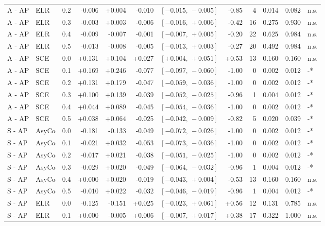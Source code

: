 \begin{landscape}
\begin{scriptsize}
\begin{longtable}{lllrrrrrrrrl}
A - AP & ELR & 0.2 & -0.006 & +0.004 & -0.010 & $[-0.015,\,-0.005]$ & -0.85 & 4 & 0.014 & 0.082 & n.s. \\
A - AP & ELR & 0.3 & -0.003 & +0.003 & -0.006 & $[-0.016,\,+0.006]$ & -0.42 & 16 & 0.275 & 0.930 & n.s. \\
A - AP & ELR & 0.4 & -0.009 & -0.007 & -0.001 & $[-0.007,\,+0.005]$ & -0.20 & 22 & 0.625 & 0.984 & n.s. \\
A - AP & ELR & 0.5 & -0.013 & -0.008 & -0.005 & $[-0.013,\,+0.003]$ & -0.27 & 20 & 0.492 & 0.984 & n.s. \\
A - AP & SCE & 0.0 & +0.131 & +0.104 & +0.027 & $[+0.004,\,+0.051]$ & +0.53 & 13 & 0.160 & 0.160 & n.s. \\
A - AP & SCE & 0.1 & +0.169 & +0.246 & -0.077 & $[-0.097,\,-0.060]$ & -1.00 & 0 & 0.002 & 0.012 & -* \\
A - AP & SCE & 0.2 & +0.131 & +0.179 & -0.047 & $[-0.059,\,-0.036]$ & -1.00 & 0 & 0.002 & 0.012 & -* \\
A - AP & SCE & 0.3 & +0.100 & +0.139 & -0.039 & $[-0.052,\,-0.025]$ & -0.96 & 1 & 0.004 & 0.012 & -* \\
A - AP & SCE & 0.4 & +0.044 & +0.089 & -0.045 & $[-0.054,\,-0.036]$ & -1.00 & 0 & 0.002 & 0.012 & -* \\
A - AP & SCE & 0.5 & +0.038 & +0.064 & -0.025 & $[-0.042,\,-0.009]$ & -0.82 & 5 & 0.020 & 0.039 & -* \\
S - AP & AsyCo & 0.0 & -0.181 & -0.133 & -0.049 & $[-0.072,\,-0.026]$ & -1.00 & 0 & 0.002 & 0.012 & -* \\
S - AP & AsyCo & 0.1 & -0.021 & +0.032 & -0.053 & $[-0.073,\,-0.036]$ & -1.00 & 0 & 0.002 & 0.012 & -* \\
S - AP & AsyCo & 0.2 & -0.017 & +0.021 & -0.038 & $[-0.051,\,-0.025]$ & -1.00 & 0 & 0.002 & 0.012 & -* \\
S - AP & AsyCo & 0.3 & -0.029 & +0.020 & -0.049 & $[-0.064,\,-0.032]$ & -0.96 & 1 & 0.004 & 0.012 & -* \\
S - AP & AsyCo & 0.4 & +0.000 & +0.020 & -0.019 & $[-0.043,\,+0.004]$ & -0.53 & 13 & 0.160 & 0.160 & n.s. \\
S - AP & AsyCo & 0.5 & -0.010 & +0.022 & -0.032 & $[-0.046,\,-0.019]$ & -0.96 & 1 & 0.004 & 0.012 & -* \\
S - AP & ELR & 0.0 & -0.125 & -0.151 & +0.025 & $[-0.023,\,+0.061]$ & +0.56 & 12 & 0.131 & 0.785 & n.s. \\
S - AP & ELR & 0.1 & +0.000 & -0.005 & +0.006 & $[-0.007,\,+0.017]$ & +0.38 & 17 & 0.322 & 1.000 & n.s. \\

\end{longtable}
\end{scriptsize}
\end{landscape}
